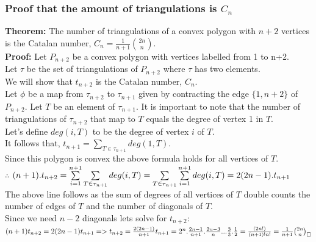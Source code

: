 \documentclass[12pt]{article}
\begin{document}
\subsubsection{Proof that the amount of triangulations is $C_n$}
{\bf Theorem:} The number of triangulations of a convex polygon with $n+2$ vertices is the Catalan number, $C_n = \frac{1}{n+1} \binom{2n}{n}$.\\
{\bf Proof:} Let $P_{n+2}$ be a convex polygon with vertices labelled from 1 to n+2.\\
Let $\tau$ be the set of triangulations of $P_{n+2}$ where $\tau$ has two elements.\\
We will show that $t_{n+2}$ is the Catalan number, $C_n$.\\
Let $\phi$ be a map from $\tau_{n+2}$ to $\tau_{n+1}$ given by contracting the edge $\{1, n+2\}$ of $P_{n+2}$.
Let $T$ be an element of $\tau_{n+1}$. It is important to note that the number of triangulations of $\tau_{n+2}$ that map to $T$ equals the degree of vertex 1 in $T$.\\
Let's define $deg(i, T)$ to be the degree of vertex $i$ of $T$.\\
It follows that, $t_{n+1} = \sum\limits_{T\in\tau_{n+1}} deg(1, T)$.\\
Since this polygon is convex the above formula holds for all vertices of $T$.\\
$\therefore$ $(n+1).t_{n+2} = \sum\limits_{i=1}^{n+1} \sum\limits_{T\in\tau_{n+1}} deg(i, T)\\
                            = \sum\limits_{T\in\tau_{n+1}} \sum\limits_{i=1}^{n+1} deg(i, T)\\
                            = 2(2n-1).t_{n+1}$\\
The above line follows as the sum of degrees of all vertices of $T$ double counts the number of edges of $T$ and the number of diagonals of $T$.\\
Since we need $n-2$ diagonals lets solve for $t_{n+2}$:\\
$(n+1)t_{n+2} = 2(2n-1)t_{n+1}\\
=>t_{n+2} = \frac{2(2n-1)}{n+1} t_{n+1} = 2^n.\frac{2n-1}{n+1}.\frac{2n-3}{n} ... \frac{3}{3}.\frac{1}{2}\\
=\frac{(2n!)}{(n+1)!n!}\\
=\frac{1}{n+1} \binom{2n}{n}_\square$

\end{document}
